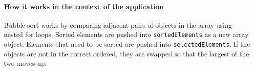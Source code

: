 \paragraph{How it works in the context of the application}
Bubble sort works by comparing adjacent pairs of objects in the array using nested for loops. Sorted elements are pushed into \lstinline{sortedElements} as a new array object. Elements that need to be sorted are pushed into \lstinline{selectedElements}. If the objects are not in the correct ordered, they are swapped so that the largest of the two moves up.




